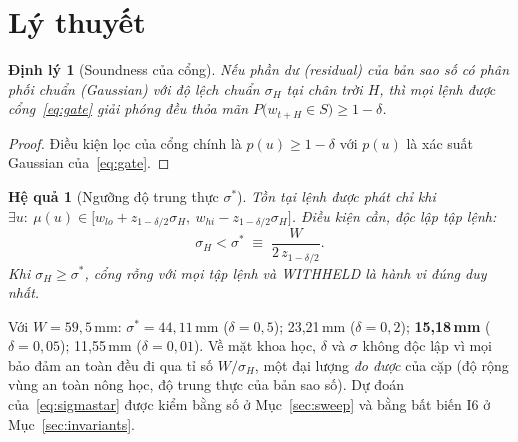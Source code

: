 \documentclass[10pt]{article}
\newtheorem{theorem}{Định lý}
\newtheorem{corollary}{Hệ quả}[theorem]
\begin{document}
\section{Lý thuyết}

\begin{theorem}[Soundness của cổng]
\label{thm:t1}
Nếu phần dư (residual) của bản sao số có phân phối chuẩn (Gaussian) với độ lệch chuẩn $\sigma_H$ tại chân trời $H$, thì mọi lệnh được cổng~\eqref{eq:gate} giải phóng đều thỏa mãn $P\big(w_{t+H} \in S\big) \ge 1-\delta$.
\end{theorem}
\begin{proof}
Điều kiện lọc của cổng chính là $p(u)\ge 1-\delta$ với $p(u)$ là xác suất Gaussian của~\eqref{eq:gate}.
\end{proof}

\begin{corollary}[Ngưỡng độ trung thực $\sigma^{*}$]
\label{cor:sigma}
Tồn tại lệnh được phát chỉ khi $\exists u:\ \mu(u) \in \big[w_{lo} + z_{1-\delta/2}\sigma_H,\ w_{hi} - z_{1-\delta/2}\sigma_H\big]$. Điều kiện cần, độc lập tập lệnh:
\begin{equation}
\sigma_H < \sigma^{*} \;\equiv\; \frac{W}{2\,z_{1-\delta/2}} .
\label{eq:sigmastar}
\end{equation}
Khi $\sigma_H \ge \sigma^{*}$, cổng \emph{rỗng với mọi tập lệnh} và WITHHELD là hành vi đúng duy nhất.
\end{corollary}

Với $W = 59{,}5$\,mm: $\sigma^{*} = 44{,}11$\,mm ($\delta{=}0{,}5$); 23,21\,mm ($\delta{=}0{,}2$); \textbf{15,18\,mm} ($\delta{=}0{,}05$); 11,55\,mm ($\delta{=}0{,}01$). Về mặt khoa học, $\delta$ và $\sigma$ không độc lập vì mọi bảo đảm an toàn đều đi qua tỉ số $W/\sigma_H$, một đại lượng \emph{đo được} của cặp (độ rộng vùng an toàn nông học, độ trung thực của bản sao số). Dự đoán của~\eqref{eq:sigmastar} được kiểm bằng số ở Mục~\ref{sec:sweep} và bằng bất biến I6 ở Mục~\ref{sec:invariants}.
\end{document}
